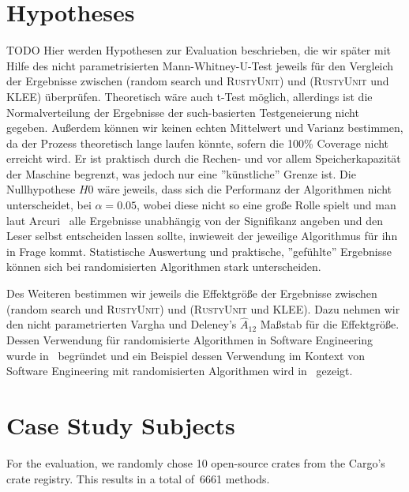 \documentclass[paper=a4,%
  twoside,%
  BCOR4mm,%
  abstract=true,%
  toc=bibliography,%
  chapterprefix=true,%
  toc=bibliographynumbered,%
  open=right,%
  english,%
  pagesize=pdftex]{scrreprt}
\newcommand{\benchnum}{10\xspace}
\newcommand{\methodsnum}{6661\xspace}
\newcommand{\tech}{\textsc{RustyUnit}\xspace}
\begin{document}
\section{Hypotheses}
\label{sec:hypotheses}
TODO Hier werden Hypothesen zur Evaluation beschrieben, die wir später mit Hilfe des nicht parametrisierten Mann-Whitney-U-Test jeweils für den Vergleich der Ergebnisse zwischen (random search und \tech) und (\tech und \textsc{KLEE}) überprüfen. Theoretisch wäre auch t-Test möglich, allerdings ist die Normalverteilung der Ergebnisse der such-basierten Testgeneierung nicht gegeben. Außerdem können wir keinen echten Mittelwert und Varianz bestimmen, da der Prozess theoretisch lange laufen könnte, sofern die 100\% Coverage nicht erreicht wird. Er ist praktisch durch die Rechen- und vor allem Speicherkapazität der Maschine begrenzt, was jedoch nur eine ''künstliche'' Grenze ist. Die Nullhypothese $H0$ wäre jeweils, dass sich die Performanz der Algorithmen nicht unterscheidet, bei $\alpha = 0.05$, wobei diese nicht so eine große Rolle spielt und man laut Arcuri~\cite{Arcuri2011} alle Ergebnisse unabhängig von der Signifikanz angeben und den Leser selbst entscheiden lassen sollte, inwieweit der jeweilige Algorithmus für ihn in Frage kommt. Statistische Auswertung und praktische, ''gefühlte'' Ergebnisse können sich bei randomisierten Algorithmen stark unterscheiden. 

Des Weiteren bestimmen wir jeweils die Effektgröße der Ergebnisse zwischen (random search und \tech) und (\tech und \textsc{KLEE}). Dazu nehmen wir den nicht parametrierten Vargha und Deleney's $\hat{A}_{12}$ Maßstab für die Effektgröße. Dessen Verwendung für randomisierte Algorithmen in Software Engineering wurde in~\cite{Leech2002} begründet und ein Beispiel dessen Verwendung im Kontext von Software Engineering mit randomisierten Algorithmen wird in~\cite{Poulding2010} gezeigt. 

\section{Case Study Subjects}
\label{sec:case-study-subjects}
For the evaluation, we randomly chose \benchnum open-source crates from the Cargo's crate registry. This results in a total of~\methodsnum methods.
\end{document}
